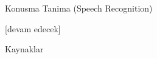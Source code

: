 \documentclass[12pt,fleqn]{article}\usepackage{../../common}
\begin{document}
Konusma Tanima (Speech Recognition)












[devam edecek]

Kaynaklar
\end{document}
